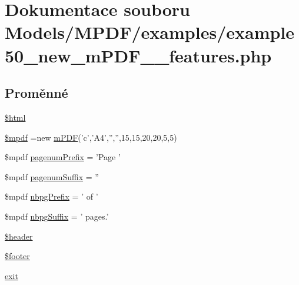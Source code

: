 \hypertarget{example50__new__m_p_d_f__3__features_8php}{\section{Dokumentace souboru Models/\-M\-P\-D\-F/examples/example50\-\_\-new\-\_\-m\-P\-D\-F\-\_\-\_\-features.php}
\label{example50__new__m_p_d_f__3__features_8php}
}
\subsection*{Proměnné}
\begin{DoxyCompactItemize}
\item 
\hyperlink{example50__new__m_p_d_f__3__features_8php_a6f96e7fc92441776c9d1cd3386663b40}{\$html}
\item 
\hyperlink{example50__new__m_p_d_f__3__features_8php_ad028f81910d6cbab9b184d2214b3a8f8}{\$mpdf} =new \hyperlink{classm_p_d_f}{m\-P\-D\-F}('c','A4','','',15,15,20,20,5,5)
\item 
\$mpdf \hyperlink{example50__new__m_p_d_f__3__features_8php_a5047450368f927b66e9691e488132607}{pagenum\-Prefix} = 'Page '
\item 
\$mpdf \hyperlink{example50__new__m_p_d_f__3__features_8php_a31f34f9e336bf5b112faf453c718050e}{pagenum\-Suffix} = ''
\item 
\$mpdf \hyperlink{example50__new__m_p_d_f__3__features_8php_aec32dfb96d5db969897939f63590b2f4}{nbpg\-Prefix} = ' of '
\item 
\$mpdf \hyperlink{example50__new__m_p_d_f__3__features_8php_ae4dad106499071cb7ffd88bd470cfe7f}{nbpg\-Suffix} = ' pages.'
\item 
\hyperlink{example50__new__m_p_d_f__3__features_8php_a4f44601f2b9dc8a1644bce53c94ce622}{\$header}
\item 
\hyperlink{example50__new__m_p_d_f__3__features_8php_abaa4216c852c51c380dd8f10d3cfe944}{\$footer}
\item 
\hyperlink{example50__new__m_p_d_f__3__features_8php_a6733eb5f605d09eaede9845835d71c4e}{exit}
\end{DoxyCompactItemize}


